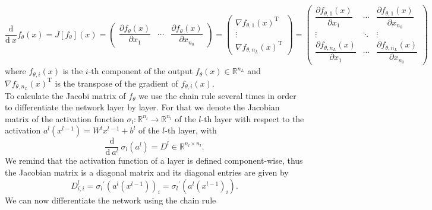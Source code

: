 \begin{equation*}
    \frac{\mathrm{d}}{\mathrm{d} \ x} f_{\theta}(x) = \mathrm{}J[f_{\theta}](x)= \begin{pmatrix} \dfrac{\partial f_{\theta}(x)}{\partial x_{1}} & \cdots & \dfrac{\partial f_{\theta}(x)}{\partial x_{n_0}} \end{pmatrix} = \begin{pmatrix} \nabla f_{\theta, 1}(x)^{\mathrm{T}} \\ \vdots \\  \nabla f_{\theta, n_L}(x)^{\mathrm{T}} \end{pmatrix} = \begin{pmatrix} \dfrac{\partial f_{\theta, 1}(x)}{\partial x_{1}} & \cdots & \dfrac{\partial f_{\theta, 1}(x)}{\partial x_{n_0}} \\ \vdots & \ddots & \vdots \\ \dfrac{\partial f_{\theta, n_L}(x)}{\partial x_{1}} & \cdots & \dfrac{\partial f_{\theta, n_L}(x)}{\partial x_{n_0}} \end{pmatrix} 
\end{equation*}
where $f_{\theta, i}(x)$ is the $i$-th component of the output $f_{\theta}(x) \in \mathbb{R}^{n_L}$ and $\nabla f_{\theta, n_L}(x)^{\mathrm{T}}$ is the transpose of the gradient of $f_{\theta, i}(x)$. \\
To calculate the Jacobi matrix of $f_{\theta}$ we use the chain rule several times in order to differentiate the network layer by layer. For that we denote the Jacobian matrix of the activation function $\sigma_{l} \colon \mathbb{R}^{n_l} \to \mathbb{R}^{n_l}$ of the $l$-th layer with respect to the activation $a^l(x^{l-1}) = W^{l} x^{l-1} + b^{l}$ of the $l$-th layer, with
\begin{equation*}
    \frac{\mathrm{d}}{\mathrm{d} \ a^{l}} \ \sigma_{l} (a^l) = D^{l} \in \mathbb{R}^{n_l \times n_l}.
\end{equation*}
We remind that the activation function of a layer is defined component-wise, thus the Jacobian matrix is a diagonal matrix and its diagonal entries are given by
\begin{equation*}
    D_{i, i}^{l} = {\sigma_{l}}^{\prime} (a^{l}(x^{l-1}))_i = {\sigma_{l}}^{\prime} (a^{l}(x^{l-1})_i).
\end{equation*} 
We can now differentiate the network using the chain rule

